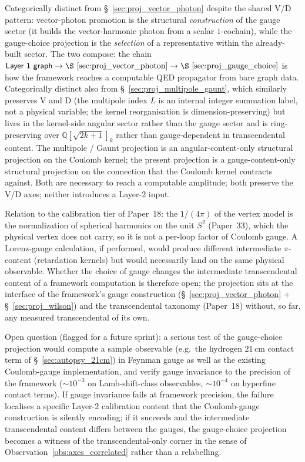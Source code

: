 \documentclass[11pt]{article}
\begin{document}
Categorically distinct from \S~\ref{sec:proj_vector_photon} despite
the shared V/D pattern: vector-photon promotion is the structural
\emph{construction} of the gauge sector (it builds the vector-harmonic
photon from a scalar $1$-cochain), while the gauge-choice projection
is the \emph{selection} of a representative within the already-built
sector.  The two compose: the chain $\textsf{Layer~1 graph} \to
\S~\ref{sec:proj_vector_photon} \to \S~\ref{sec:proj_gauge_choice}$ is
how the framework reaches a computable QED propagator from bare graph
data.  Categorically distinct also from
\S~\ref{sec:proj_multipole_gaunt}, which similarly preserves V and D
(the multipole index $L$ is an internal integer summation label, not
a physical variable; the kernel reorganisation is dimension-preserving)
but lives in the kernel-side angular sector rather than the gauge
sector and is ring-preserving over $\mathbb{Q}[\sqrt{2k{+}1}]_k$ rather
than gauge-dependent in transcendental content.  The multipole / Gaunt
projection is an angular-content-only structural projection on the
Coulomb kernel; the present projection is a gauge-content-only
structural projection on the connection that the Coulomb kernel
contracts against.  Both are necessary to reach a computable
amplitude; both preserve the V/D axes; neither introduces a Layer-2
input.

Relation to the calibration tier of Paper~18: the $1/(4\pi)$
of the vertex model is the normalization of spherical harmonics on the
unit $S^2$ (Paper~33), which the physical vertex does not carry, so it
is not a per-loop factor of Coulomb gauge.  A Lorenz-gauge calculation,
if performed, would produce different intermediate $\pi$-content
(retardation kernels) but would necessarily land on the same physical
observable.  Whether the choice of gauge changes the intermediate
transcendental content of a framework computation is therefore open;
the projection sits at the interface of the framework's gauge
construction (\S~\ref{sec:proj_vector_photon} +
\S~\ref{sec:proj_wilson}) and the transcendental taxonomy (Paper~18)
without, so far, any measured transcendental of its own.

Open question (flagged for a future sprint): a serious test of the
gauge-choice projection would compute a sample observable (e.g.\ the
hydrogen $21$\,cm contact term of \S~\ref{sec:autopsy_21cm}) in
Feynman gauge as well as the existing Coulomb-gauge implementation,
and verify gauge invariance to the precision of the framework
($\sim10^{-3}$ on Lamb-shift-class observables, $\sim10^{-4}$ on
hyperfine contact terms).  If gauge invariance fails at framework
precision, the failure localises a specific Layer-2 calibration
content that the Coulomb-gauge construction is silently encoding;
if it succeeds and the intermediate transcendental content differs
between the gauges, the gauge-choice projection becomes a witness of
the transcendental-only corner in the sense of
Observation~\ref{obs:axes_correlated} rather than a relabelling.
\end{document}
